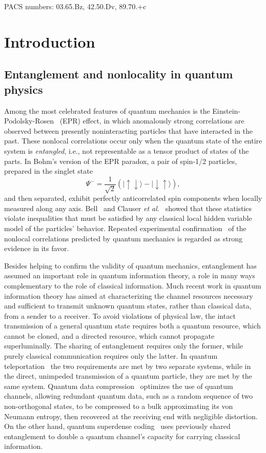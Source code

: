 \bigskip\noindent
PACS numbers: 03.65.Bz, 42.50.Dv, 89.70.+c
 
 
 
\section{Introduction}
\label{sec:intro}
 
\subsection{Entanglement and nonlocality in quantum physics}
\label{subsec:E}
 
Among the most celebrated features of quantum mechanics is the
Einstein-Podolsky-Rosen~\cite{EPR} (EPR) effect, in which anomalously
strong correlations are observed between presently noninteracting
particles that have interacted in the past.  These nonlocal correlations
occur only when the quantum state of the entire system is {\em
entangled\/}, i.e., not representable as a tensor product of states of
the parts.  In Bohm's version of the EPR paradox, a pair
of spin-1/2 particles, prepared in the singlet state
\begin{equation}
\Psi^-=\frac{1}{\sqrt{2}}(|\!\uparrow\downarrow\rangle-
|\!\downarrow\uparrow\rangle),\label{sing}
\end{equation}
and then separated, exhibit perfectly anticorrelated spin components
when locally measured along any axis.  Bell~\cite{Bell} and Clauser
{\it et al.}~\cite{CHSH} showed that these statistics violate
inequalities that must be satisfied by any classical local hidden
variable model of the particles' behavior.  Repeated experimental
confirmation~\cite{bellex}
of the nonlocal correlations predicted by quantum
mechanics is regarded as strong evidence in its favor.
 
Besides helping to confirm the validity of quantum mechanics,
entanglement has assumed an important role in quantum information
theory, a role in many ways complementary to the role of classical
information. Much recent work in quantum information theory has aimed
at characterizing the channel resources necessary and sufficient to
transmit unknown quantum states, rather than classical data, from a
sender to a receiver. To avoid violations of physical law, the intact
transmission of a general quantum state requires both a quantum
resource, which cannot be cloned, and a directed resource, which
cannot propagate superluminally.  The sharing of entanglement requires
only the former, while purely classical communication requires only
the latter.  In quantum teleportation~\cite{teleportation} the two
requirements are met by two separate systems, while in the direct,
unimpeded transmission of a quantum particle, they are met by the same
system.  Quantum data compression~\cite{Schu} optimizes the use of
quantum channels, allowing redundant quantum data, such as a random
sequence of two non-orthogonal states, to be compressed to a bulk
approximating its von Neumann entropy, then recovered at the receiving
end with negligible distortion.  On the other hand, quantum superdense
coding~\cite{superdense} uses previously shared entanglement to double
a quantum channel's capacity for carrying classical information.
 
